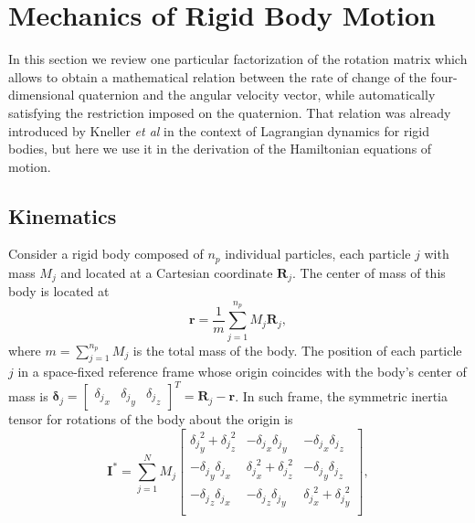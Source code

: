 \documentclass[aip,jcp,reprint,amsmath,amssymb]{revtex4-1}
\newcommand{\mt}[1]{\boldsymbol{\mathbf{#1}}}           %
\newcommand{\vt}[1]{\boldsymbol{\mathbf{#1}}}           %
\newcommand{\tr}[1]{#1^T}                               %
\begin{document}
\section{Mechanics of Rigid Body Motion}
\label{sec:mechanics}
In this section we review one particular factorization of the rotation matrix which allows to obtain a mathematical relation between the rate of change of the four-dimensional quaternion and the angular velocity vector, while automatically satisfying the restriction imposed on the quaternion. That relation was already introduced by Kneller \textit{et al}\cite{Kneller1994} in the context of Lagrangian dynamics for rigid bodies, but here we use it in the derivation of the Hamiltonian equations of motion.

\subsection{Kinematics}

Consider a rigid body composed of $n_p$ individual particles, each particle $j$ with mass $M_j$ and located at a Cartesian coordinate $\vt R_j$. The center of mass of this body is located at
\[
\vt r = \frac{1}{m}\sum_{j=1}^{n_p} M_j {\vt R}_j,
\]
where $m = \sum_{j=1}^{n_p} M_j$ is the total mass of the body. The position of each particle $j$ in a space-fixed reference frame whose origin coincides with the body's center of mass is ${\vt \delta}_j = \tr{ [\begin{array}{ccc} {\delta_j}_x & {\delta_j}_y & {\delta_j}_z \end{array}]} = {\vt R}_j - {\vt r}$. In such frame, the symmetric inertia tensor for rotations of the body about the origin is\cite{Goldstein2002}
\[
{\mt I}^\ast = \sum_{j=1}^N M_j \left[ \begin{array}{ccc}
{\delta_j}_y^2 + {\delta_j}_z^2 & -{\delta_j}_x {\delta_j}_y & -{\delta_j}_x {\delta_j}_z \\
-{\delta_j}_y {\delta_j}_x & {\delta_j}_x^2 + {\delta_j}_z^2 & -{\delta_j}_y {\delta_j}_z \\
-{\delta_j}_z {\delta_j}_x & -{\delta_j}_z {\delta_j}_y & {\delta_j}_x^2 + {\delta_j}_y^2 \\
\end{array} \right],
\]
\end{document}
